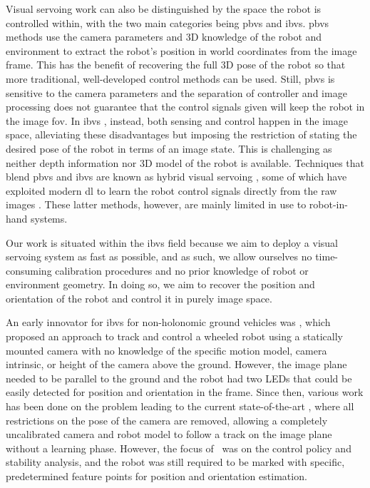 \documentclass[conference]{ieeeconf}
\begin{document}
Visual servoing work can also be distinguished by the space the robot is controlled within, with the two main categories being \gls{pbvs} and \gls{ibvs}.
\Gls{pbvs} methods \cite{lippiello2004visual, janbi2010kalman, xue2021performance} use the camera parameters and 3D knowledge of the robot and environment to extract the robot's position in world coordinates from the image frame.
This has the benefit of recovering the full 3D pose of the robot so that more traditional, well-developed control methods can be used.
Still, \gls{pbvs} is sensitive to the camera parameters \cite{shademan2005sensitivity} and the separation of controller and image processing does not guarantee that the control signals given will keep the robot in the image \gls{fov}.
%
In \gls{ibvs} \cite{tsakalis2019adaptive}, instead, both sensing and control happen in the image space, alleviating these disadvantages but imposing the restriction of stating the desired pose of the robot in terms of an image state.
This is challenging as neither depth information nor 3D model of the robot is available.
%
Techniques that blend \gls{pbvs} and \gls{ibvs} are known as hybrid visual servoing \cite{malis1999hybrid}, some of which have exploited modern \gls{dl} to learn the robot control signals directly from the raw images \cite{machkour2022classical}.
These latter methods, however, are mainly limited in use to robot-in-hand systems.

Our work is situated within the \gls{ibvs} field because we aim to deploy a visual servoing system as fast as possible, and as such, we allow ourselves no time-consuming calibration procedures and no prior knowledge of robot or environment geometry.
In doing so, we aim to recover the position and orientation of the robot and control it in purely image space.

An early innovator for \gls{ibvs} for non-holonomic ground vehicles was \cite{dixon2001adaptive}, which proposed an approach to track and control a wheeled robot using a statically mounted camera with no knowledge of the specific motion model, camera intrinsic, or height of the camera above the ground.
However, the image plane needed to be parallel to the ground and the robot had two LEDs that could be easily detected for position and orientation in the frame.
Since then, various work has been done on the problem \cite{wang2010dynamic, liang2015adaptive, yang2018adaptive} leading to the current state-of-the-art \cite{liang2020purely}, where all restrictions on the pose of the camera are removed, allowing a completely uncalibrated camera and robot model to follow a track on the image plane without a learning phase.
However, the focus of~\cite{liang2020purely} was on the control policy and stability analysis, and the robot was still required to be marked with specific, predetermined feature points for position and orientation estimation.
\end{document}
